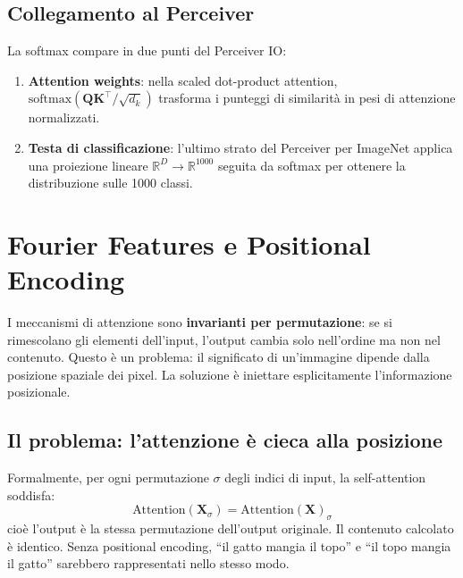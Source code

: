 \documentclass[
  11pt,
]{article}
\begin{document}
\subsection{Collegamento al Perceiver}

\begin{notabox}[title={\textbf{Softmax nel Perceiver}}]
La softmax compare in due punti del Perceiver IO:
\begin{enumerate}
  \item \textbf{Attention weights}: nella scaled dot-product attention, $\text{softmax}(\mathbf{Q}\mathbf{K}^\top/\sqrt{d_k})$ trasforma i punteggi di similarità in pesi di attenzione normalizzati.
  \item \textbf{Testa di classificazione}: l'ultimo strato del Perceiver per ImageNet applica una proiezione lineare $\mathbb{R}^D \to \mathbb{R}^{1000}$ seguita da softmax per ottenere la distribuzione sulle 1000 classi.
\end{enumerate}
\end{notabox}

\section{Fourier Features e Positional Encoding}
\label{app:fourier-theory}

I meccanismi di attenzione sono \textbf{invarianti per permutazione}: se si rimescolano gli elementi dell'input, l'output cambia solo nell'ordine ma non nel contenuto. Questo è un problema: il significato di un'immagine dipende dalla posizione spaziale dei pixel. La soluzione è iniettare esplicitamente l'informazione posizionale.

\subsection{Il problema: l'attenzione è cieca alla posizione}

Formalmente, per ogni permutazione $\sigma$ degli indici di input, la self-attention soddisfa:
\[
\text{Attention}(\mathbf{X}_{\sigma}) = \text{Attention}(\mathbf{X})_{\sigma}
\]
cioè l'output è la stessa permutazione dell'output originale. Il contenuto calcolato è identico. Senza positional encoding, ``il gatto mangia il topo'' e ``il topo mangia il gatto'' sarebbero rappresentati nello stesso modo.

\end{document}
